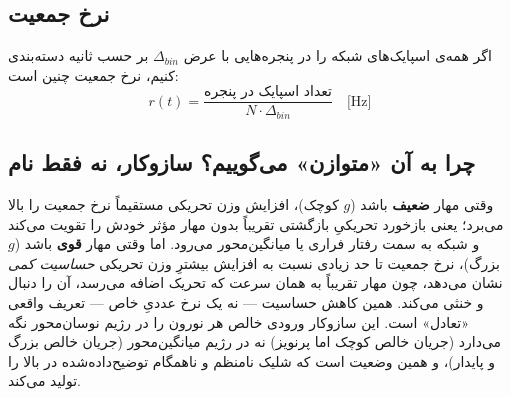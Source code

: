 \documentclass[11pt,a4paper]{article}
\begin{document}
\subsection{نرخ جمعیت}
اگر همه‌ی اسپایک‌های شبکه را در پنجره‌هایی با عرض
$\Delta_{bin}$
بر حسب ثانیه دسته‌بندی کنیم، نرخ جمعیت چنین است:
$$r(t) = \frac{\text{تعداد اسپایک در پنجره}}{N \cdot \Delta_{bin}} \quad \text{[Hz]}$$

\subsection{چرا به آن «متوازن» می‌گوییم؟ سازوکار، نه فقط نام}
\begin{keybox}
	وقتی مهار \textbf{ضعیف} باشد
	($g$ کوچک)،
	افزایش وزن تحریکی مستقیماً نرخ جمعیت را بالا می‌برد؛ یعنی بازخورد تحریکیِ بازگشتی تقریباً بدون مهار مؤثر خودش را تقویت می‌کند و شبکه به سمت رفتار فراری یا میانگین‌محور می‌رود. اما وقتی مهار \textbf{قوی} باشد
	($g$ بزرگ)،
	نرخ جمعیت تا حد زیادی نسبت به افزایش بیشترِ وزن تحریکی \emph{حساسیت کمی} نشان می‌دهد، چون مهار تقریباً به همان سرعت که تحریک اضافه می‌رسد، آن را دنبال و خنثی می‌کند. همین کاهش حساسیت — نه یک نرخ عددیِ خاص — تعریف واقعی «تعادل» است. این سازوکار ورودی خالص هر نورون را در رژیم نوسان‌محور نگه می‌دارد
	(جریان خالص کوچک اما پرنویز)
	نه در رژیم میانگین‌محور
	(جریان خالص بزرگ و پایدار)،
	و همین وضعیت است که شلیک نامنظم و ناهمگام توضیح‌داده‌شده در بالا را تولید می‌کند.
\end{keybox}


\newpage

\end{document}
